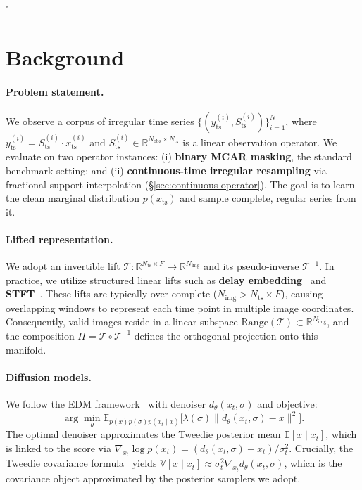 "\documentclass{article}
\theoremstyle{plain}
\theoremstyle{definition}
\theoremstyle{remark}
\newcommand{\tsimg}{\mathcal{T}}
\newcommand{\imgts}{\mathcal{T}^{-1}}
\newcommand{\Nts}{N_{\mathrm{ts}}}
\newcommand{\Nimg}{N_{\mathrm{img}}}
\newcommand{\Nobs}{N_{\mathrm{obs}}}
\newcommand{\yts}{y_{\mathrm{ts}}}
\newcommand{\xts}{x_{\mathrm{ts}}}
\begin{document}
\vspace{-2mm}
\section{Background}
\label{sec:background}
\vspace{-1mm}

\paragraph{Problem statement.}
We observe a corpus of irregular time series $\{(\yts^{(i)}, S_{\mathrm{ts}}^{(i)})\}_{i=1}^N$, where $\yts^{(i)} = S_{\mathrm{ts}}^{(i)} \cdot \xts^{(i)}$ and $S_{\mathrm{ts}}^{(i)} \in \mathbb{R}^{\Nobs \times \Nts}$ is a linear observation operator. We evaluate on two operator instances: (i) \textbf{binary MCAR masking}, the standard benchmark setting; and (ii) \textbf{continuous-time irregular resampling} via fractional-support interpolation (\S\ref{sec:continuous-operator}). The goal is to learn the clean marginal distribution $p(\xts)$ and sample complete, regular series from it.

\paragraph{Lifted representation.}
We adopt an invertible lift $\tsimg : \mathbb{R}^{\Nts \times F} \to \mathbb{R}^{\Nimg}$ and its pseudo-inverse $\imgts$. In practice, we utilize structured linear lifts such as \textbf{delay embedding}~\citep{takens1981embedding} and \textbf{STFT}~\citep{griffin1984signal}. These lifts are typically over-complete ($\Nimg > \Nts \times F$), causing overlapping windows to represent each time point in multiple image coordinates. Consequently, valid images reside in a linear subspace $\mathrm{Range}(\tsimg) \subset \mathbb{R}^{\Nimg}$, and the composition $\Pi = \tsimg \circ \imgts$ defines the orthogonal projection onto this manifold.

\paragraph{Diffusion models.}
We follow the EDM framework~\citep{karras2022edm} with denoiser $d_\theta(x_t, \sigma)$ and objective:
\begin{equation}
\arg\min_\theta \mathbb{E}_{p(x) p(\sigma) p(x_t \mid x)} \bigl[ \lambda(\sigma) \| d_\theta(x_t, \sigma) - x \|^2 \bigr].
\end{equation}
The optimal denoiser approximates the Tweedie posterior mean $\mathbb{E}[x \mid x_t]$, which is linked to the score via $\nabla_{x_t} \log p(x_t) = (d_\theta(x_t, \sigma) - x_t)/\sigma_t^2$. Crucially, the Tweedie covariance formula~\citep{efron2011tweedie} yields $\mathbb{V}[x \mid x_t] \approx \sigma_t^2 \nabla_{x_t} d_\theta(x_t, \sigma)$, which is the covariance object approximated by the posterior samplers we adopt.
\end{document}
